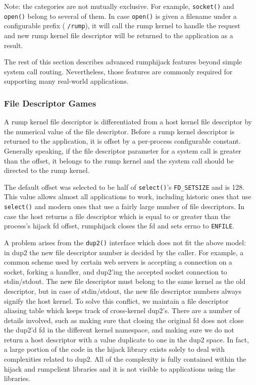 Note: the categories are not mutually exclusive.  For example,
\verb+socket()+ and \verb+open()+ belong to several of them.  In
case \texttt{open()} is given a filename under a configurable prefix (\eg
\verb+/rump+), it will call the rump kernel to
handle the request and new rump kernel file descriptor will be
returned to the application as a result.

The rest of this section describes advanced rumphijack features
beyond simple system call routing.  Nevertheless, those features
are commonly required for supporting many real-world applications.

\subsubsection*{File Descriptor Games}
      
A rump kernel file descriptor is differentiated from a host kernel
file descriptor by the numerical value of the file descriptor.
Before a rump kernel descriptor is returned to the application, it
is offset by a per-process configurable constant.  Generally
speaking, if the file descriptor parameter for a system call is
greater than the offset, it belongs to the rump kernel and the
system call should be directed to the rump kernel.

The default offset was selected to be half of \verb+select()+'s
\verb+FD_SETSIZE+ and is 128.  This value allows almost all applications
to work, including historic ones that use \verb+select()+ and modern
ones that use a fairly large number of file descriptors.  In case
the host returns a file descriptor which is equal to or greater
than the process's hijack fd offset, rumphijack closes the fd and
sets errno to \verb+ENFILE+.

A problem arises from the \verb+dup2()+ interface which does not
fit the above model: in dup2 the new file descriptor number is
decided by the caller.  For example, a common scheme used \eg by
certain web servers is accepting a connection on a socket, forking
a handler, and dup2'ing the accepted socket connection to stdin/stdout.
The new file descriptor must belong to the same kernel as the old
descriptor, but in case of stdin/stdout, the new file descriptor
numbers always signify the host kernel.  To solve this conflict, we maintain
a file descriptor aliasing table which keeps track of cross-kernel
dup2's.  There are a number of details involved, such as making
sure that closing the original fd does not close the dup2'd fd in
the different kernel namespace, and making sure we do not return
a host descriptor with a value duplicate to one in the dup2 space.
In fact, a large portion of the code in the hijack library exists
solely to deal with complexities related to dup2.  All of the complexity
is fully contained within the hijack and rumpclient libraries and
it is not visible to applications using the libraries.

